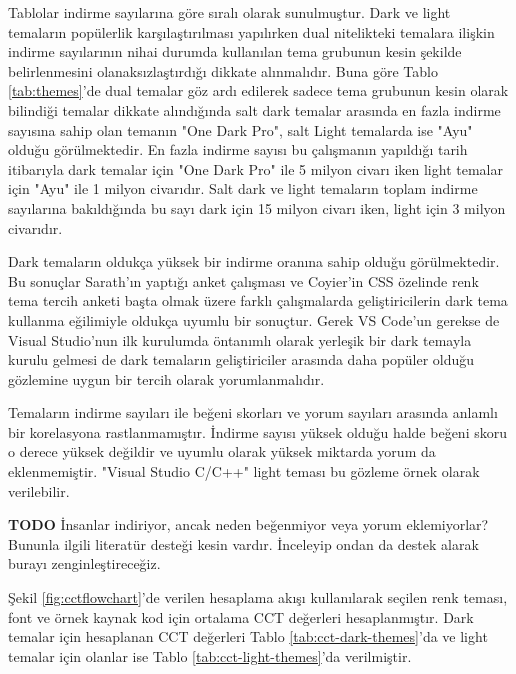\documentclass{article}
\begin{document}
Tablolar indirme sayılarına göre sıralı olarak sunulmuştur.  Dark ve light temaların popülerlik karşılaştırılması
yapılırken dual nitelikteki temalara ilişkin indirme sayılarının nihai durumda kullanılan tema grubunun kesin şekilde
belirlenmesini olanaksızlaştırdığı dikkate alınmalıdır.  Buna göre Tablo \ref{tab:themes}'de dual temalar göz ardı
edilerek sadece tema grubunun kesin olarak bilindiği temalar dikkate alındığında salt dark temalar arasında en fazla indirme
sayısına sahip olan temanın "One Dark Pro", salt Light temalarda ise "Ayu" olduğu görülmektedir. En fazla indirme sayısı bu
çalışmanın yapıldığı tarih itibarıyla dark temalar için "One Dark Pro" ile 5 milyon civarı iken light temalar için "Ayu"
ile 1 milyon civarıdır. Salt dark ve light temaların toplam indirme sayılarına bakıldığında bu sayı dark için 15 milyon
civarı iken, light için 3 milyon civarıdır.

Dark temaların oldukça yüksek bir indirme oranına sahip olduğu görülmektedir. Bu sonuçlar Sarath'ın yaptığı anket
çalışması \cite{sarath2016prefer} ve Coyier'in CSS özelinde renk tema tercih anketi \cite{coyier2013poll} başta olmak
üzere farklı çalışmalarda geliştiricilerin dark tema kullanma eğilimiyle oldukça uyumlu bir sonuçtur.  Gerek VS Code'un
gerekse de Visual Studio'nun ilk kurulumda öntanımlı olarak yerleşik bir dark temayla kurulu gelmesi de dark temaların
geliştiriciler arasında daha popüler olduğu gözlemine uygun bir tercih olarak yorumlanmalıdır.

Temaların indirme sayıları ile beğeni skorları ve yorum sayıları arasında anlamlı bir korelasyona rastlanmamıştır.
İndirme sayısı yüksek olduğu halde beğeni skoru o derece yüksek değildir ve uyumlu olarak yüksek miktarda yorum da
eklenmemiştir. "Visual Studio C/C++" light teması bu gözleme örnek olarak verilebilir.

\textbf{TODO} İnsanlar indiriyor, ancak neden beğenmiyor veya yorum eklemiyorlar? Bununla ilgili literatür desteği kesin
vardır. İnceleyip ondan da destek alarak burayı zenginleştireceğiz.

Şekil \ref{fig:cctflowchart}'de verilen hesaplama akışı kullanılarak seçilen renk teması, font ve örnek kaynak kod için
ortalama CCT değerleri hesaplanmıştır. Dark temalar için hesaplanan CCT değerleri Tablo \ref{tab:cct-dark-themes}'da ve
light temalar için olanlar ise Tablo \ref{tab:cct-light-themes}'da verilmiştir.

\end{document}

